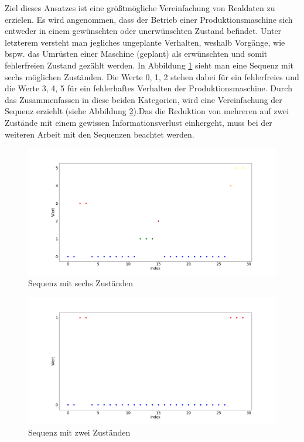 Ziel dieses Ansatzes ist eine größtmögliche Vereinfachung von Realdaten zu erzielen. Es wird angenommen, dass der Betrieb einer Produktionsmaschine sich entweder in einem gewünschten oder unerwünschten Zustand befindet. Unter letzterem versteht man jegliches ungeplante Verhalten, weshalb Vorgänge, wie bspw. das Umrüsten einer Maschine (geplant) als erwünschten und somit fehlerfreien Zustand gezählt werden. In Abbildung \ref{fig:full-status} sieht man eine Sequenz mit sechs möglichen Zuständen. Die Werte 0, 1, 2 stehen dabei für ein fehlerfreies und die Werte 3, 4, 5 für ein fehlerhaftes Verhalten der Produktionsmaschine. Durch das Zusammenfassen in diese beiden Kategorien, wird eine Vereinfachung der Sequenz erziehlt (siehe Abbildung \ref{fig:reduced-status}).Das die Reduktion von mehreren auf zwei Zustände mit einem gewissen Informationsverlust einhergeht, muss bei der weiteren Arbeit mit den Sequenzen beachtet werden.

\begin{figure}
	\centering
	\includegraphics[scale=0.32]{images/Zustandsreduktion/full}
	\caption{Sequenz mit sechs Zuständen}
	\label{fig:full-status}
\end{figure}

\begin{figure}
	\centering
		\includegraphics[scale=0.32]{images/Zustandsreduktion/reduced}
	\caption{Sequenz mit zwei Zuständen}
	\label{fig:reduced-status}
\end{figure}

